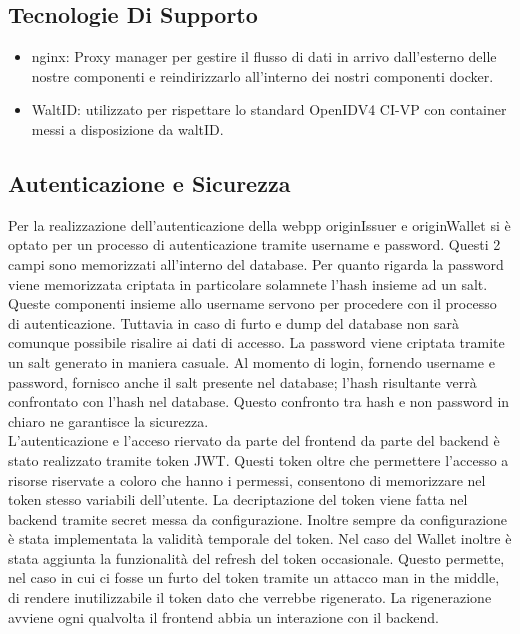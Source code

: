 \subsection{Tecnologie Di Supporto}
\begin{itemize}
    \item nginx: Proxy manager per gestire il flusso di dati in arrivo dall'esterno delle nostre componenti e reindirizzarlo all'interno dei nostri componenti docker.
    \item WaltID: utilizzato per rispettare lo standard OpenIDV4 CI-VP con container messi a disposizione da waltID.
\end{itemize}

\subsection{Autenticazione e Sicurezza}
Per la realizzazione dell'autenticazione della webpp originIssuer e originWallet si è optato per un processo di autenticazione tramite username e password. Questi 2 campi sono memorizzati all'interno del database. Per quanto rigarda la password viene memorizzata criptata in particolare solamnete l'hash insieme ad un salt. Queste componenti insieme allo username servono per procedere con il processo di autenticazione. Tuttavia in caso di furto e dump del database non sarà comunque possibile risalire ai dati di accesso. 
La password viene criptata tramite un salt generato in maniera casuale. Al momento di login, fornendo username e password, fornisco anche il salt presente nel database; l'hash risultante verrà confrontato con l'hash nel database. Questo confronto tra hash e non password in chiaro ne garantisce la sicurezza.\\
L'autenticazione e l'acceso riervato da parte del frontend da parte del backend è stato realizzato tramite token JWT. Questi token oltre che permettere l'accesso a risorse riservate a coloro che hanno i permessi, consentono di memorizzare nel token stesso variabili dell'utente. La decriptazione del token viene fatta nel backend tramite secret messa da configurazione. Inoltre sempre da configurazione è stata implementata  la validità temporale del token. Nel caso del Wallet inoltre è stata aggiunta la funzionalità del refresh del token occasionale. Questo permette, nel caso in cui ci fosse un furto del token tramite un attacco man in the middle, di rendere inutilizzabile il token dato che verrebbe rigenerato.  La rigenerazione avviene ogni qualvolta il frontend abbia un interazione con il backend.
